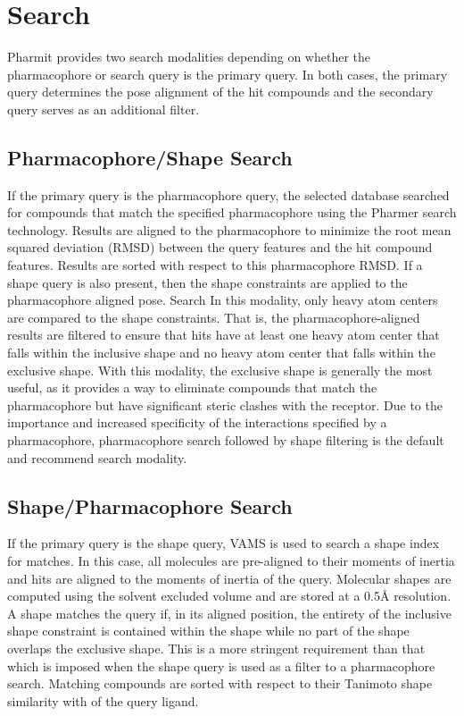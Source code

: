 \section{Search}

Pharmit provides two search modalities depending on whether the pharmacophore or search query is the primary query.  In both cases, the primary query determines the pose alignment of the hit compounds and the secondary query serves as an additional filter.

\subsection{Pharmacophore/Shape Search}

If the primary query is the pharmacophore query, the selected database searched for compounds that match the specified pharmacophore using the Pharmer \cite{Koes_2011} search technology.  Results are aligned to the pharmacophore to minimize the root mean squared deviation (RMSD) between the query features and the hit compound features. Results are sorted with respect to this pharmacophore RMSD. If a shape query is also present, then the shape constraints are applied to the pharmacophore aligned pose. Search In this modality, only heavy atom centers are compared to the shape constraints.  That is, the pharmacophore-aligned results are filtered to ensure that hits have at least one heavy atom center that falls within the inclusive shape and no heavy atom center that falls within the exclusive shape.  With this modality, the exclusive shape is generally the most useful, as it provides a way to eliminate compounds that match the pharmacophore but have significant steric clashes with the receptor.
Due to the importance and increased specificity of the interactions specified by a pharmacophore, pharmacophore search followed by shape filtering is the default and recommend search modality.

\subsection{Shape/Pharmacophore Search}

If the primary query is the shape query, VAMS \cite{vams} is used to search a shape index \cite{matchpack} for matches.  In this case, all molecules are pre-aligned to their moments of inertia and hits are aligned to the moments of inertia of the query.  Molecular shapes are computed using the solvent excluded volume and are stored at a 0.5{\AA} resolution. A shape matches the query if, in its aligned position, the entirety of the inclusive shape constraint is contained within the shape while no part of the shape overlaps the exclusive shape.  This is a more stringent requirement than that which is imposed when the shape query is used as a filter to a pharmacophore search.
Matching compounds are sorted with respect to their Tanimoto shape similarity with of the query ligand. 


